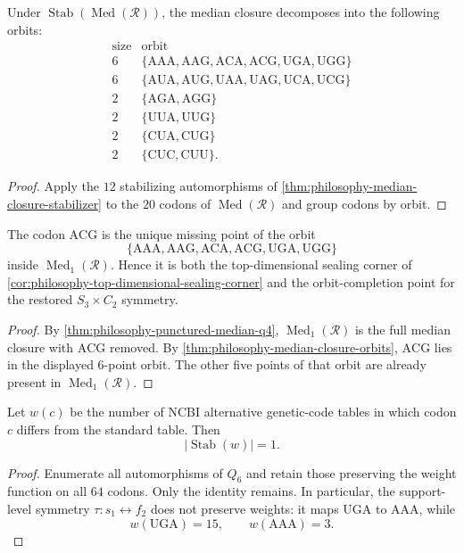 \begin{theorem}
\label{thm:philosophy-median-closure-orbits}
Under $\operatorname{Stab}(\operatorname{Med}(\mathcal{R}))$, the
median closure decomposes into the following orbits:
$$
\begin{array}{c|l}
  \text{size} & \text{orbit}\\
  \hline
  6 & \{\mathrm{AAA},\mathrm{AAG},\mathrm{ACA},
        \mathrm{ACG},\mathrm{UGA},\mathrm{UGG}\}\\
  6 & \{\mathrm{AUA},\mathrm{AUG},\mathrm{UAA},
        \mathrm{UAG},\mathrm{UCA},\mathrm{UCG}\}\\
  2 & \{\mathrm{AGA},\mathrm{AGG}\}\\
  2 & \{\mathrm{UUA},\mathrm{UUG}\}\\
  2 & \{\mathrm{CUA},\mathrm{CUG}\}\\
  2 & \{\mathrm{CUC},\mathrm{CUU}\}.
\end{array}
$$
\end{theorem}
\begin{proof}
Apply the $12$ stabilizing automorphisms of
\autoref{thm:philosophy-median-closure-stabilizer} to the $20$ codons
of $\operatorname{Med}(\mathcal{R})$ and group codons by orbit.
\end{proof}

\begin{theorem}
\label{thm:philosophy-acg-orbit-completion}
The codon $\mathrm{ACG}$ is the unique missing point of the orbit
$$
  \{\mathrm{AAA},\mathrm{AAG},\mathrm{ACA},
    \mathrm{ACG},\mathrm{UGA},\mathrm{UGG}\}
$$
inside $\operatorname{Med}_{1}(\mathcal{R})$. Hence it is both the
top-dimensional sealing corner of
\autoref{cor:philosophy-top-dimensional-sealing-corner} and the
orbit-completion point for the restored $S_{3}\times C_{2}$ symmetry.
\end{theorem}
\begin{proof}
By \autoref{thm:philosophy-punctured-median-q4},
$\operatorname{Med}_{1}(\mathcal{R})$ is the full median closure with
$\mathrm{ACG}$ removed. By
\autoref{thm:philosophy-median-closure-orbits}, $\mathrm{ACG}$ lies in
the displayed $6$-point orbit. The other five points of that orbit are
already present in $\operatorname{Med}_{1}(\mathcal{R})$.
\end{proof}

\begin{theorem}
\label{thm:philosophy-weighted-symmetry-trivial}
Let $w(c)$ be the number of NCBI alternative genetic-code tables in
which codon $c$ differs from the standard table. Then
$$
  |\operatorname{Stab}(w)|=1.
$$
\end{theorem}
\begin{proof}
Enumerate all automorphisms of $Q_{6}$ and retain those preserving the
weight function on all $64$ codons. Only the identity remains. In
particular, the support-level symmetry $\tau:s_{1}\leftrightarrow f_{2}$
does not preserve weights: it maps $\mathrm{UGA}$ to $\mathrm{AAA}$,
while
$$
  w(\mathrm{UGA})=15,\qquad w(\mathrm{AAA})=3.
$$
\end{proof}

